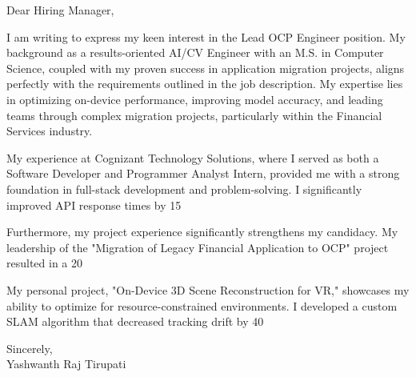 \documentclass[letterpaper,11pt]{article}
\begin{document}
\begin{flushleft}
Dear Hiring Manager,

\vspace{12pt}

I am writing to express my keen interest in the Lead OCP Engineer position.  My background as a results-oriented AI/CV Engineer with an M.S. in Computer Science, coupled with my proven success in application migration projects, aligns perfectly with the requirements outlined in the job description.  My expertise lies in optimizing on-device performance, improving model accuracy, and leading teams through complex migration projects, particularly within the Financial Services industry.

\vspace{12pt}

My experience at Cognizant Technology Solutions, where I served as both a Software Developer and Programmer Analyst Intern, provided me with a strong foundation in full-stack development and problem-solving.  I significantly improved API response times by 15%

\vspace{12pt}

Furthermore, my project experience significantly strengthens my candidacy.  My leadership of the "Migration of Legacy Financial Application to OCP" project resulted in a 20%

\vspace{12pt}

My personal project, "On-Device 3D Scene Reconstruction for VR," showcases my ability to optimize for resource-constrained environments. I developed a custom SLAM algorithm that decreased tracking drift by 40%

\vspace{20pt}

Sincerely, \\
\vspace{15pt}
Yashwanth Raj Tirupati

\end{flushleft}
\end{document}
